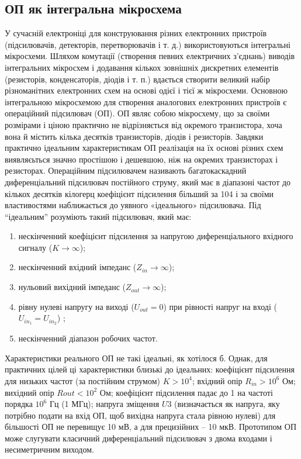 \documentclass[
  ukrainian,
  14pt
]{extreport}
\begin{document}
\subsection{ОП як інтегральна мікросхема}
У сучасній електроніці для конструювання різних електронних пристроїв
(підсилювачів, детекторів, перетворювачів і т. д.) використовуються інтегральні
мікросхеми. Шляхом комутації (створення певних електричних з'єднань) виводів
інтегральних мікросхем і додавання кількох зовнішніх дискретних елементів
(резисторів, конденсаторів, діодів і т. п.) вдається створити великий набір
різноманітних електронних схем на основі одієї і тієї ж мікросхеми.
Основною інтегральною мікросхемою для створення аналогових електронних
пристроїв є операційний підсилювач (ОП). ОП являє собою мікросхему, що за
своїми розмірами і ціною практично не відрізняється від окремого транзистора,
хоча вона й містить кілька десятків транзисторів, діодів і резисторів.
Завдяки практично ідеальним характеристикам ОП реалізація на їх основі різних
схем виявляєьться значно простішою і дешевшою, ніж на окремих транзисторах
і резисторах.
Операційним підсилювачем називають багатокаскадний диференціальний
підсилювач постійного струму, який має в діапазоні частот до кількох десятків
кілогерц коефіцієнт підсилення більший за 104 і за своїми властивостями
наближається до уявного «ідеального» підсилювача. Під ``ідеальним'' розуміють
такий підсилювач, який має:
\begin{enumerate}
    \item нескінченний коефіцієнт підсилення за напругою диференціального вхідного
    сигналу ($K \rightarrow \infty$);
    \item нескінченний вхідний імпеданс ($Z_{in} \rightarrow \infty$);
    \item нульовий вихідний імпеданс ($Z_{out} \rightarrow \infty$);
    \item  рівну нулеві напругу на виході ($U_{out} = 0$) при рівності напруг на вході
    ($U_{in_{1}} = U_{in_{2}}$) ;
    \item нескінченний діапазон робочих частот.
\end{enumerate}

Характеристики реального ОП не такі ідеальні, як хотілося б. Однак, для
практичних цілей ці характеристики близькі до ідеальних: коефіцієнт підсилення
для низьких частот (за постійним струмом) $K > 10^4$; вхідний опір $R_{in} > 10^6$ Ом;
вихідний опір $R{out} < 10^2$ Ом; коефіцієнт підсилення падає до 1 на частоті
порядка $10^6$ Гц (1 МГц); напруга зміщення $U3$ (визначається як напруга, яку
потрібно подати на вхід ОП, щоб вихідна напруга стала рівною нулеві) для
більшості ОП не перевищує 10 мВ, а для прецизійних – 10 мкВ.
Прототипом ОП може слугувати класичний диференціальний підсилювач з
двома входами і несиметричним виходом.
\end{document}
